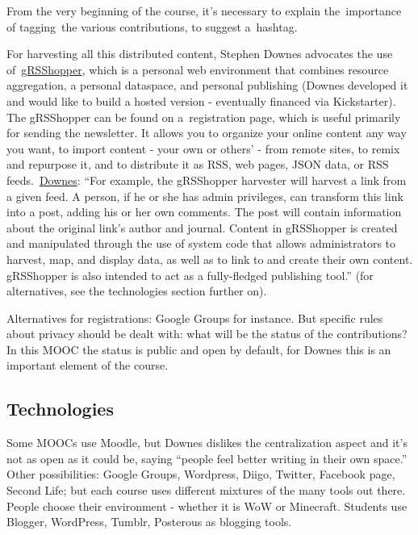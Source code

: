 From the very beginning of the course, it's necessary to explain
the~importance of tagging~the various contributions, to suggest
a~hashtag.

For harvesting all this distributed content, Stephen Downes advocates
the use of~\href{http://grsshopper.downes.ca/index.html}{gRSShopper},
which is a personal web environment that combines resource aggregation,
a personal dataspace, and personal publishing (Downes developed it and
would like to build a hosted version - eventually financed via
Kickstarter). The gRSShopper can be found on a~registration page, which
is useful primarily for sending the newsletter. It allows you to
organize your online content any way you want, to import content - your
own or others' - from remote sites, to remix and repurpose it, and to
distribute it as RSS, web pages, JSON data, or RSS
feeds.~\href{http://grsshopper.downes.ca/about.htm}{Downes}: ``For
example, the gRSShopper harvester will harvest a link from a given feed.
A person, if he or she has admin privileges, can transform this link
into a post, adding his or her own comments. The post will contain
information about the original link's author and journal. Content in
gRSShopper is created and manipulated through the use of system code
that allows administrators to harvest, map, and display data, as well as
to link to and create their own content. gRSShopper is also intended to
act as a fully-fledged publishing tool.'' (for alternatives, see the
technologies section further on).

Alternatives for registrations: Google Groups for instance. But specific
rules about privacy should be dealt with: what will be the status of the
contributions? In this MOOC the status is public and open by default,
for Downes this is an important element of the course.

\subsection{Technologies}

Some MOOCs use Moodle, but Downes dislikes the centralization aspect and
it's not as open as it could be, saying ``people feel better writing in
their own space.'' Other possibilities: Google Groups, Wordpress, Diigo,
Twitter, Facebook page, Second Life; but each course uses different
mixtures of the many tools out there. People choose their environment -
whether it is WoW or Minecraft. Students use Blogger, WordPress, Tumblr,
Posterous as blogging tools.

